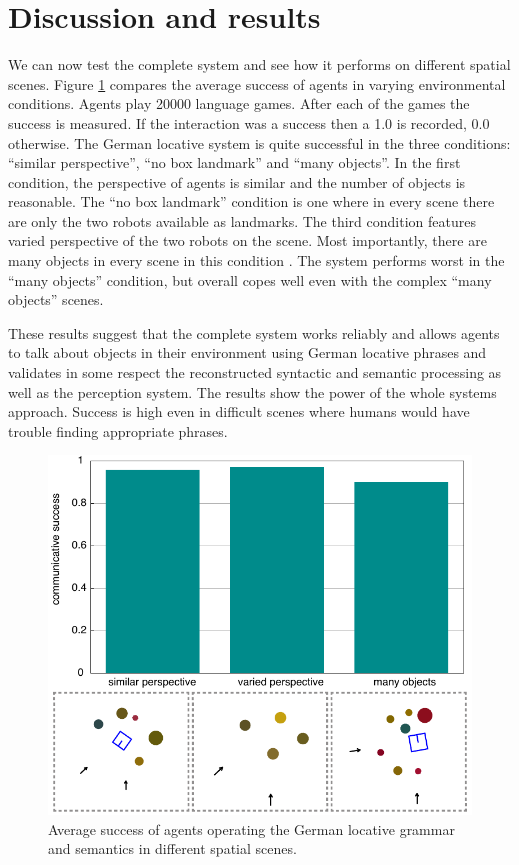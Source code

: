 \section{Discussion and results}
\label{s:syntax+semantics-integration}
We can now test the complete system and see how it performs
on different spatial scenes. Figure \ref{f:interpretations} compares the average success 
of agents in varying environmental conditions. Agents play 20000 language
games. After each of the games the success is measured. If the interaction 
was a success then a 1.0 is recorded, 0.0 otherwise. The German locative system 
is quite successful in the three conditions: ``similar perspective'', 
``no box landmark'' and ``many objects''. In the first condition, the 
perspective of agents is similar and the number of objects is reasonable.
The ``no box landmark'' condition is one where in every scene there are only the two
robots available as landmarks. The third condition features varied perspective of the two
robots on the scene. Most importantly, there are many objects in every scene in this condition .
The system performs worst in the ``many objects'' condition, but overall copes 
well even with the complex ``many objects'' scenes.

These results suggest that the complete system works reliably and allows agents
to talk about objects in their environment using German locative phrases and
validates in some respect the reconstructed syntactic and semantic processing 
as well as the perception system. The results show the power of the whole systems approach.
Success is high even in difficult scenes where humans would have trouble finding appropriate
phrases.

\begin{figure}
\begin{center}
\includegraphics[width=.8\columnwidth]{figs/results-german-grammar}
\end{center}
\caption[Average success of agents operating the German locative system]{%
Average success of agents operating the German locative grammar
and semantics in different spatial scenes.}
\label{f:interpretations}
\end{figure}


%
% 
%
